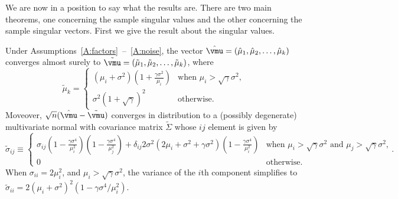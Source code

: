 We are now in a position to say what the results are.  There are two main
theorems, one concerning the sample singular values and the other concerning
the sample singular vectors.  First we give the result about the singular
values.
\begin{theorem}\label{T:values}
    Under Assumptions~\ref{A:factors}~--~\ref{A:noise},
    the vector $\hat \vmu = (\hat \mu_1, \hat \mu_2, \ldots, \hat \mu_k)$
    converges almost surely to 
    $\tilde \vmu = (\tilde \mu_1, \tilde \mu_2, \ldots, \tilde \mu_k)$,
    where
    \[
        \tilde \mu_k
        =
        \begin{cases}
            \left( \mu_i + \sigma^2 \right)
            \left( 1 + \frac{ \gamma \sigma^2 }{ \mu_i } \right)
                &\text{when $\mu_i > \sqrt{\gamma} \sigma^2$}, \\
            \sigma^2 \left( 1 + \sqrt{\gamma} \right)^2
                &\text{otherwise.}
        \end{cases}
    \]
    Moveover, 
    \(
        \sqrt{n} (\hat \vmu - \tilde \vmu)
    \)
    converges in distribution to a (possibly degenerate) multivariate normal
    with covariance matrix $\tilde \Sigma$ whose $ij$ element is given by
    \[
        \tilde \sigma_{ij}
        \equiv
        \begin{cases}
            \sigma_{ij} 
            \left(
                1 - \frac{ \gamma \sigma^4 }{ \mu_i^2 }
            \right)
            \left(
                1 - \frac{ \gamma \sigma^4 }{ \mu_j^2 }
            \right)
            +
            \delta_{ij}
            2
            \sigma^2
            \left(
                2 \mu_i + \sigma^2 + \gamma \sigma^2 \right)
            \left(
                1 - \frac{ \gamma \sigma^4 }{ \mu_i^2 }
            \right)
                &\text{when $\mu_i > \sqrt{\gamma} \sigma^2$ 
                       and $\mu_j > \sqrt{\gamma} \sigma^2$,} \\
            0
                &\text{otherwise.}
        \end{cases}.
    \]
    When $\sigma_{ii} = 2 \mu_i^2$, 
    and $\mu_i > \sqrt{\gamma} \sigma^2$, the variance of the $i$th
    component simplifies to
    \(
        \tilde \sigma_{ii} 
        = 
        2 (\mu_i + \sigma^2)^2 \left( 1 - \gamma \sigma^4 / \mu_i^2 \right).
    \)
\end{theorem}

